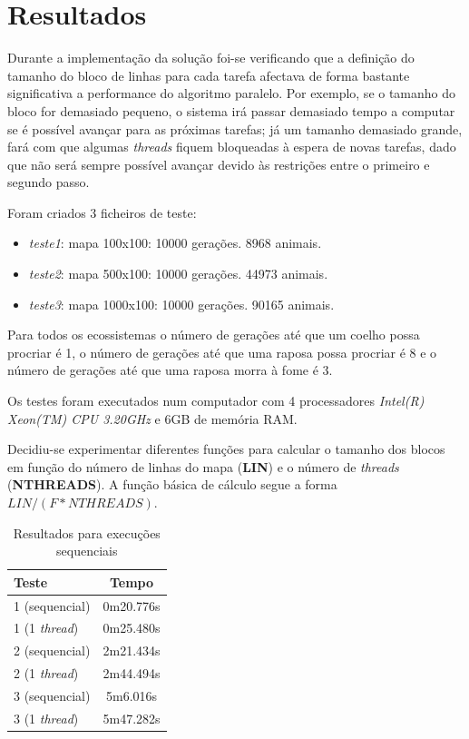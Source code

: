 \documentclass[12pt]{article}
\begin{document}
\section{Resultados}

Durante a implementação da solução foi-se verificando que a definição do tamanho do bloco de linhas
para cada tarefa afectava de forma bastante significativa a performance do algoritmo paralelo.
Por exemplo, se o tamanho do bloco for demasiado pequeno, o sistema irá passar demasiado tempo
a computar se é possível avançar para as próximas tarefas; já um tamanho demasiado grande,
fará com que algumas \textit{threads} fiquem bloqueadas à espera de novas tarefas, dado que não será sempre
possível avançar devido às restrições entre o primeiro e segundo passo.

Foram criados 3 ficheiros de teste:

\begin{itemize}
  \item \textit{teste1}: mapa 100x100: 10000 gerações. 8968 animais.
  \item \textit{teste2}: mapa 500x100: 10000 gerações. 44973 animais.
  \item \textit{teste3}: mapa 1000x100: 10000 gerações. 90165 animais.
\end{itemize}

Para todos os ecossistemas o número de gerações até que um coelho possa procriar é 1, o número
de gerações até que uma raposa possa procriar é 8 e o número de gerações até que uma raposa morra à fome é 3.

Os testes foram executados num computador com 4 processadores \textit{Intel(R) Xeon(TM) CPU 3.20GHz} e 6GB de
memória RAM.

Decidiu-se experimentar diferentes funções para calcular o tamanho dos blocos em função do número de linhas
do mapa (\textbf{LIN}) e o número de \textit{threads} (\textbf{NTHREADS}). A função básica de cálculo
segue a forma $LIN / (F * NTHREADS)$.

\begin{table}[H]
\begin{center}
    \begin{tabular}{ | l | c |}
      \hline
      \textbf{Teste} & \textbf{Tempo} \\ \hline
      1 (sequencial) & 0m20.776s \\ \hline
      1 (1 \textit{thread}) & 0m25.480s \\ \hline
      2 (sequencial) & 2m21.434s \\ \hline
      2 (1 \textit{thread}) & 2m44.494s \\ \hline
      3 (sequencial) & 5m6.016s \\ \hline
      3 (1 \textit{thread}) & 5m47.282s \\ \hline
  \end{tabular}
  \caption{Resultados para execuções sequenciais}
  \label{tbl:resultados_seq}
\end{center}
\end{table}
\end{document}

